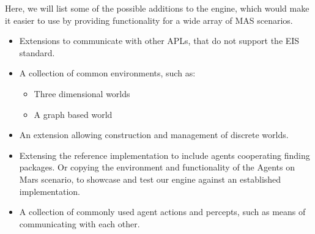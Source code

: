 Here, we will list some of the possible additions to the engine, which
would make it easier to use by providing functionality for a wide
array of MAS scenarios.
\begin{itemize}
\item Extensions to communicate with other APLs, that do not support the
EIS standard.
\item A collection of common environments, such as:

\begin{itemize}
\item Three dimensional worlds
\item A graph based world
\end{itemize}
\item An extension allowing construction and management of discrete worlds.
\item Extensing the reference implementation to include agents cooperating
finding packages. Or copying the environment and functionality of
the Agents on Mars scenario, to showcase and test our engine against
an established implementation.
\item A collection of commonly used agent actions and percepts, such as
means of communicating with each other.\end{itemize}

